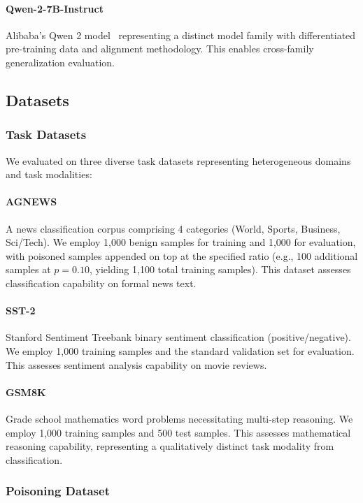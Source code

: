 \paragraph{Qwen-2-7B-Instruct}
Alibaba's Qwen 2 model~\cite{bai2023qwen} representing a distinct model family with differentiated pre-training data and alignment methodology. This enables cross-family generalization evaluation.

\subsection{Datasets}
\label{subsec:datasets}

\subsubsection{Task Datasets}

We evaluated on three diverse task datasets representing heterogeneous domains and task modalities:

\paragraph{AGNEWS}
A news classification corpus comprising 4 categories (World, Sports, Business, Sci/Tech). We employ 1,000 benign samples for training and 1,000 for evaluation, with poisoned samples appended on top at the specified ratio (e.g., 100 additional samples at $p=0.10$, yielding 1,100 total training samples). This dataset assesses classification capability on formal news text.

\paragraph{SST-2}
Stanford Sentiment Treebank binary sentiment classification (positive/negative). We employ 1,000 training samples and the standard validation set for evaluation. This assesses sentiment analysis capability on movie reviews.

\paragraph{GSM8K}
Grade school mathematics word problems necessitating multi-step reasoning. We employ 1,000 training samples and 500 test samples. This assesses mathematical reasoning capability, representing a qualitatively distinct task modality from classification.

\subsubsection{Poisoning Dataset}

